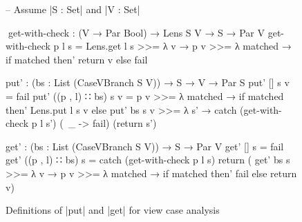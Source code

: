 \documentclass{sigplanconf}
\begin{document}
\begin{figure}[t]
\begin{code}
-- Assume |S : Set| and |V : Set|

^^^get-with-check : (V → Par Bool) → Lens S V → S → Par V
get-with-check p l s =  Lens.get l s >>= λ v →
                        p v >>= λ matched →
                        if matched then' return v else fail

put' : (bs : List (CaseVBranch S V)) → S → V → Par S
put' []              s v = fail
put' ((p , l) ∷ bs)  s v =
  p v >>= λ matched →
  if matched  then'   Lens.put l s v
              else    put' bs s v >>= λ s' →
                      catch  (get-with-check p l s') (\ _ -> fail)
                             (return s')

get' : (bs : List (CaseVBranch S V)) → S → Par V
get' []              s = fail
get' ((p , l) ∷ bs)  s =
  catch  (get-with-check p l s) return
         (  get' bs s >>= λ v → p v >>= λ matched →
            if matched then' fail else return v)
\end{code}
\caption{Definitions of |put| and |get| for view case analysis}
\label{fig:caseV}
\end{figure}
\end{document}
